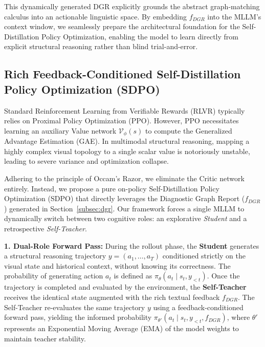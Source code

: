 \documentclass{article}
\begin{document}
This dynamically generated DGR explicitly grounds the abstract graph-matching calculus into an actionable linguistic space. By embedding $f_{DGR}$ into the MLLM's context window, we seamlessly prepare the architectural foundation for the Self-Distillation Policy Optimization, enabling the model to learn directly from explicit structural reasoning rather than blind trial-and-error.

\subsection{Rich Feedback-Conditioned Self-Distillation Policy Optimization (SDPO)}
\label{subsec:sdpo}

Standard Reinforcement Learning from Verifiable Rewards (RLVR) typically relies on Proximal Policy Optimization (PPO). However, PPO necessitates learning an auxiliary Value network $\mathcal{V}_\phi(s)$ to compute the Generalized Advantage Estimation (GAE). In multimodal structural reasoning, mapping a highly complex visual topology to a single scalar value is notoriously unstable, leading to severe variance and optimization collapse. 

Adhering to the principle of Occam's Razor, we eliminate the Critic network entirely. Instead, we propose a pure on-policy Self-Distillation Policy Optimization (SDPO) that directly leverages the Diagnostic Graph Report ($f_{DGR}$) generated in Section~\ref{subsec:dgr}. Our framework forces a single MLLM to dynamically switch between two cognitive roles: an explorative \textit{Student} and a retrospective \textit{Self-Teacher}.

\textbf{1. Dual-Role Forward Pass:} 
During the rollout phase, the \textbf{Student} generates a structural reasoning trajectory $y = (a_1, \dots, a_T)$ conditioned strictly on the visual state and historical context, without knowing its correctness. The probability of generating action $a_t$ is defined as $\pi_\theta(a_t \mid s_t, y_{<t})$.
Once the trajectory is completed and evaluated by the environment, the \textbf{Self-Teacher} receives the identical state augmented with the rich textual feedback $f_{DGR}$. The Self-Teacher re-evaluates the same trajectory $y$ using a feedback-conditioned forward pass, yielding the informed probability $\pi_{\theta'}(a_t \mid s_t, y_{<t}, f_{DGR})$, where $\theta'$ represents an Exponential Moving Average (EMA) of the model weights to maintain teacher stability.
\end{document}
